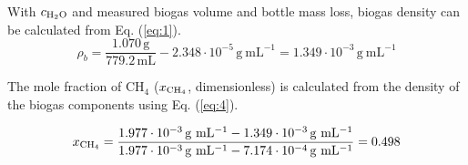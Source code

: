 \documentclass[]{article}
\newcommand{\unit}[1]{\ensuremath{\, \mathrm{#1}}}
\begin{document}
With $c\textsubscript{H$_2$O}$ and measured biogas volume and bottle mass loss, biogas density can be calculated from Eq. (\ref{eq:1}).
\begin{equation*}
  \rho_b=\frac{1.070 \unit{g}}{779.2 \unit{mL}} - 2.348 \cdot 10^{-5} \unit{g~mL^{-1}} = 1.349 \cdot 10^{-3} \unit{g~mL^{-1}}
\end{equation*}

The mole fraction of CH$_4$ ($x\textsubscript{CH$_4$}$, dimensionless) is calculated from the density of the biogas components using Eq. (\ref{eq:4}). 

\begin{equation*}
  x\textsubscript{CH$_4$}=\frac{1.977  \cdot 10^{-3} \unit{g~mL^{-1}} - 1.349 \cdot 10^{-3} \unit{g~mL^{-1}}}
  {1.977  \cdot 10^{-3} \unit{g~mL^{-1}} - 7.174 \cdot 10^{-4} \unit{g~mL^{-1}}}
  = 0.498
\end{equation*}


\end{document}
